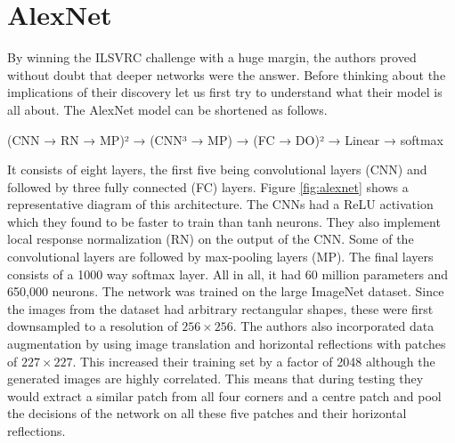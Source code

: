 \documentclass{../template/texnote}
\begin{document}
\section{AlexNet}
By winning the ILSVRC challenge with a huge margin, the authors proved without doubt that deeper networks were the answer.
Before thinking about the implications of their discovery let us first try to understand what their model is all about.
The AlexNet model can be shortened as follows.

(CNN → RN → MP)² → (CNN³ → MP) → (FC → DO)² → Linear → softmax

It consists of eight layers, the first five being convolutional layers (CNN) and followed by three fully connected (FC) layers.
Figure \ref{fig:alexnet} shows a representative diagram of this architecture.
The CNNs had a ReLU activation which they found to be faster to train than tanh neurons.
They also implement local response normalization (RN) on the output of the CNN.
Some of the convolutional layers are followed by max-pooling layers (MP).
The final layers consists of a 1000 way softmax layer.
All in all, it had 60 million parameters and 650,000 neurons.
The network was trained on the large ImageNet dataset. Since the images from the dataset had arbitrary rectangular shapes, these were first downsampled to a resolution of 
$ 256 \times 256 $.
The authors also incorporated data augmentation by using image translation and horizontal reflections with patches of $227 \times 227$.
This increased their training set by a factor of 2048 although the generated images are highly correlated.
This means that during testing they would extract a similar patch from all four corners and a centre patch and pool the decisions of the network on all these five patches 
and their horizontal reflections.
\end{document}

